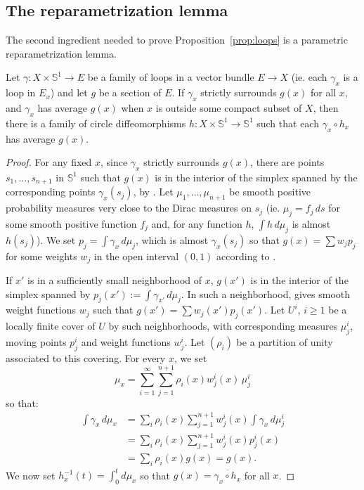 \subsection{The reparametrization lemma}
\label{sub:the_reparametrization_lemma}

The second ingredient needed to prove Proposition~\ref{prop:loops} is a
parametric reparametrization lemma.

\begin{lemma}
\label{lem:reparametrization}
Let $γ : X × 𝕊^1 → E$ be a family of loops in a vector bundle $E → X$ (ie. each
$γ_x$ is a loop in $E_x$) and let $g$ be a section of $E$. If
$γ_x$ strictly  surrounds $g(x)$ for all $x$, and $γ_x$ has average $g(x)$ when
$x$ is outside some compact subset of $X$, then there is a family of circle
diffeomorphisms $h : X × 𝕊^1 → 𝕊^1$ such that each $γ_x ∘ h_x$ has average $g(x)$.
\end{lemma}

\begin{proof}
  For any fixed $x$, since $γ_x$ strictly surrounds $g(x)$, there are points
  $s_1, …, s_{n+1}$ in $𝕊^1$ such that $g(x)$ is in the interior of the simplex
  spanned by the corresponding points $γ_x(s_j)$, by
  .
  Let $μ_1, …, μ_{n+1}$ be smooth positive probability measures very
  close to the Dirac measures on $s_j$ (ie. $μ_j = f_j\, ds$ for some
  smooth positive function $f_j$ and, for any function $h$,
  $\int h\,dμ_j$ is almost $h(s_j)$).  We set $p_j = \int γ_x\, d\mu_j$, which
  is almost $γ_x(s_j)$ so that $g(x) = \sum w_j p_j$ for some weights
  $w_j$ in the open interval $(0, 1)$ according to .

  If $x'$ is in a sufficiently small neighborhood of $x$, $g(x')$ is in
  the interior of the simplex spanned by
  $p_j(x') := \int γ_{x'}\, d\mu_j$.
  In such a neighborhood,  gives
  smooth weight functions $w_j$
  such that $g(x') = \sum w_j(x')p_j(x')$.
  Let $U^i$, $i ≥ 1$ be a locally finite cover of $U$ by such
  neighborhoods, with corresponding measures $μ_j^i$, moving points
  $p_j^i$ and weight functions $w_j^i$.
  Let $(ρ_i)$ be a partition of unity associated to this covering. For
  every $x$, we set
  \[
    μ_x = \sum_{i=1}^∞ \sum_{j=1}^{n+1} ρ_i(x)w_j^i(x)\, μ_j^i
  \]
  so that:
  \begin{align*}
    \int γ_x\, dμ_x &=
    \sum_i ρ_i(x)\sum_{j=1}^{n+1} w_j^i(x) \int γ_x\, dμ_j^i\\
    &= \sum_i ρ_i(x)\sum_{j=1}^{n+1} w_j^i(x) p_j^i(x)\\
    &= \sum_i ρ_i(x) g(x) = g(x).
  \end{align*}
  We now set $h_x^{-1}(t) = \int_0^tdμ_x$ so that
  $g(x) = \overline{γ_x ∘ h_x}$ for all $x$.
\end{proof}

